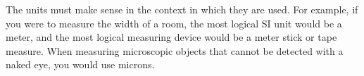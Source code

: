 \documentclass{ximera}
\begin{document}
The units must make sense in the context in which they are used.  For example, if you were to measure the width of a room, the most logical SI unit would be a meter, and the most logical measuring device would be a meter stick or tape measure.  When measuring microscopic objects that cannot be detected with a naked eye, you would use microns.

\end{document}
